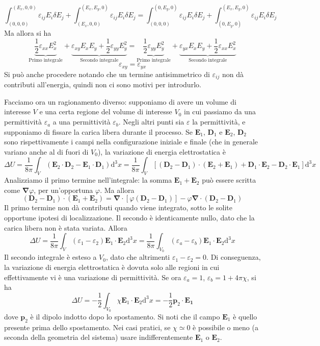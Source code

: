 \documentclass[a4paper,11pt]{book}
\renewcommand{\d}{\mathrm{d}}
\let\oldnabla\nabla
\renewcommand{\nabla}{\vec{\oldnabla}}
\renewcommand{\vec}[1]{\mathbf{#1}}
\theoremstyle{theorem}
\theoremstyle{definition}
\begin{document}
\[\int_{(0,0,0)}^{(E_x,0,0)}\varepsilon_{ij}E_i\delta E_j+\int_{(E_x,0,0)}^{(E_x,E_y,0)}\varepsilon_{ij}E_i\delta E_j=\int_{(0,0,0)}^{(0,E_y,0)}\varepsilon_{ij}E_i\delta E_j+\int_{(0,E_y,0)}^{(E_x,E_y,0)}\varepsilon_{ij}E_i\delta E_j\]
Ma allora si ha
\[\underbrace{\frac{1}{2}\varepsilon_{xx}E_x^2}_{\textrm{Primo integrale}}+\underbrace{\varepsilon_{xy}E_xE_y+\frac{1}{2}\varepsilon_{yy}E_y^2}_{\textrm{Secondo integrale}}=\underbrace{\frac{1}{2}\varepsilon_{yy}E_y^2}_{\textrm{Primo integrale}}+\underbrace{\varepsilon_{yx}E_xE_y+\frac{1}{2}\varepsilon_{xx}E_x^2}_{\textrm{Secondo integrale}}\]
\[\varepsilon_{xy}=\varepsilon_{yx}\]
Si può anche procedere notando che un termine antisimmetrico di $\varepsilon_{ij}$ non dà contributi all'energia, quindi non ci sono motivi per introdurlo.

Facciamo ora un ragionamento diverso: supponiamo di avere un volume di interesse $V$ e una certa regione del volume di interesse $V_0$ in cui passiamo da una permittività $\varepsilon_a$ a una permittività $\varepsilon_b$. Negli altri punti sia $\varepsilon$ la permittività, e supponiamo di fissare la carica libera durante il processo. Se $\vec{E}_1$, $\vec{D}_1$ e $\vec{E}_2$, $\vec{D}_2$ sono rispettivamente i campi nella configurazione iniziale e finale (che in generale variano anche al di fuori di $V_0$), la variazione di energia elettrostatica è
\[\Delta U=\frac{1}{8\pi}\int_V(\vec{E}_2\cdot\vec{D}_2-\vec{E}_1\cdot\vec{D}_1
)\d^3x=\frac{1}{8\pi}\int_V[(\vec{D}_2-\vec{D}_1)\cdot(\vec{E}_2+\vec{E}_1)+\vec{D}_1\cdot\vec{E}_2-\vec{D}_2\cdot\vec{E}_1]\d^3x\]
Analizziamo il primo termine nell'integrale: la somma $\vec{E}_1+\vec{E}_2$ può essere scritta come $\nabla\varphi$, per un'opportuna $\varphi$. Ma allora
\[(\vec{D}_2-\vec{D}_1)\cdot(\vec{E}_1+\vec{E}_2)=\nabla\cdot[\varphi(\vec{D}_2-\vec{D}_1)]-\varphi\nabla\cdot(\vec{D}_2-\vec{D}_1)\]
Il primo termine non dà contributi quando viene integrato, sotto le solite opportune ipotesi di localizzazione. Il secondo è identicamente nullo, dato che la carica libera non è stata variata. Allora
\[\Delta U=\frac{1}{8\pi}\int_V(\varepsilon_1-\varepsilon_2)\vec{E}_1\cdot\vec{E}_2\d^3x=\frac{1}{8\pi}\int_{V_0}(\varepsilon_a-\varepsilon_b)\vec{E}_1\cdot\vec{E}_2\d^3x\]
Il secondo integrale è esteso a $V_0$, dato che altrimenti $\varepsilon_1-\varepsilon_2=0$. Di conseguenza, la variazione di energia elettrostatica è dovuta solo alle regioni in cui effettivamente vi è una variazione di permittività. Se ora $\varepsilon_a=1$, $\varepsilon_b=1+4\pi\chi$, si ha
\[\Delta U=-\frac{1}{2}\int_{V_0}\chi\vec{E}_1\cdot\vec{E}_2\d^3x=-\frac{1}{2}\vec{p}_2\cdot\vec{E_1}\]
dove $\vec{p}_2$ è il dipolo indotto dopo lo spostamento. Si noti che il campo $\vec{E}_1$ è quello presente prima dello spostamento. Nei casi pratici, se $\chi\simeq0$ è possibile o meno (a seconda della geometria del sistema) usare indifferentemente $\vec{E}_1$ o $\vec{E}_2$.
\end{document}
